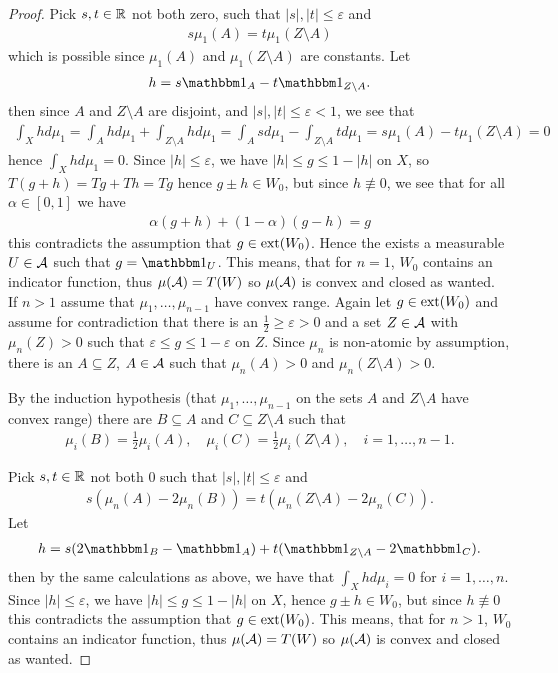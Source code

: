 \begin{proof}
Pick $s,t\in \mathbb{R}$ not both zero, such that $|s|,|t| \le \varepsilon$ and
\begin{align*}
	s\mu_{1}(A) = t\mu_{1}(Z\setminus A)
\end{align*}
which is possible since $\mu_{1}(A)$ and $\mu_{1}(Z\setminus A)$ are constants. Let
\begin{align*}
	h=s\ind{A} - t\ind{Z\setminus A}.
\end{align*}
then since $A$ and $Z\setminus A$ are disjoint, and $|s|,|t|\le \varepsilon < 1$, we see that
\begin{align*}
	\int_{X}hd\mu_{1}=\int_{A}hd\mu_{1} + \int_{Z\setminus A}hd\mu_{1}=\int_{A}sd\mu_{1}-\int_{Z\setminus A}td\mu_{1}=s\mu_{1}(A) - t\mu_{1}(Z\setminus A)=0
\end{align*}
hence $\int_{X} h d\mu_{1}=0$. Since $|h|\le \varepsilon$, we have $|h|\le g \le 1-|h|$ on $X$, so $T(g+h)=Tg+Th=Tg$ hence $g\pm h \in W_{0}$, but since $h\not\equiv 0$, we see that for all $\alpha\in [0,1]$ we have
\begin{align*}
	\alpha(g+h)+ (1-\alpha)(g-h)=g
\end{align*}
this contradicts the assumption that $g\in \operatorname{ext}(W_{0})$. Hence the exists a measurable $U\in \mathcal{A}$ such that $g=\ind{U}$. This means, that for $n=1$, $W_{0}$ contains an indicator function, thus $\mu(\mathcal{A})=T(W)$ so $\mu(\mathcal{A})$ is convex and closed as wanted. \\

If $n > 1$ assume that $\mu_{1}, \dots, \mu_{n-1}$ have convex range. Again let $g\in \operatorname{ext}(W_{0})$ and assume for contradiction that there is an $\frac{1}{2} \ge \varepsilon > 0$ and a set $Z\in \mathcal{A}$ with $\mu_{n}(Z)>0$ such that $\varepsilon \le g \le 1-\varepsilon$ on $Z$. Since $\mu_{n}$ is non-atomic by assumption, there is an $A\subseteq Z$, $A\in \mathcal{A}$ such that $\mu_{n}(A)>0$ and $\mu_{n}(Z\setminus A)>0$.

By the induction hypothesis (that $\mu_{1}, \dots, \mu_{n-1}$ on the sets $A$ and $Z\setminus A$ have convex range) there are $B\subseteq A$ and $C\subseteq Z\setminus A$ such that
\begin{align*}
	\mu_{i}(B)=\frac{1}{2}\mu_{i}(A), \quad \mu_{i}(C)=\frac{1}{2}\mu_{i}(Z\setminus A), \quad i=1, \dots, n-1.
\end{align*}

Pick $s,t\in \mathbb{R}$ not both $0$ such that $|s|,|t|\le \varepsilon$ and
\begin{align*}
	s(\mu_{n}(A) - 2\mu_{n}(B)) = t(\mu_{n}(Z\setminus A) - 2\mu_{n}(C)).
\end{align*}
Let
\begin{align*}
	h=s(2\ind{B}-\ind{A}) + t(\ind{Z\setminus A} - 2\ind{C}).
\end{align*}
then by the same calculations as above, we have that $\int_{X} h d\mu_{i}=0$ for $i=1, \dots, n$. Since $|h|\le \varepsilon$, we have $|h|\le g \le 1-|h|$ on $X$, hence $g\pm h \in W_{0}$, but since $h\not\equiv 0$ this contradicts the assumption that $g\in \operatorname{ext}(W_{0})$. This means, that for $n > 1$, $W_{0}$ contains an indicator function, thus $\mu(\mathcal{A})=T(W)$ so $\mu(\mathcal{A})$ is convex and closed as wanted.


\end{proof}
